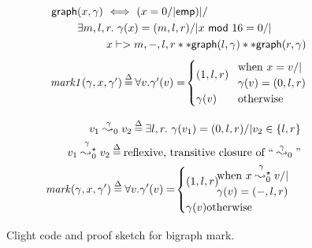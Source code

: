 \begin{figure}[t]
{\footnotesize
\begin{flushleft}
\begin{minipage}[c]{0.5\textwidth}
\begin{equation*}
\label{eqn:bigraphintrofoldunfold}
\begin{split}
\quad \mathsf{graph}&(x, \gamma) ~ <=> ~ (x = 0 /| \mathsf{emp}) |/ \\
& \exists m,l,r.~ \gamma(x)=(m,l,r) /| x~\mathsf{mod}~16 = 0 /| \\
& \qquad ~~ x |-> m,-,l,r ** \mathsf{graph}(l, \gamma) ** \mathsf{graph}(r, \gamma)
\end{split}
\end{equation*}
\begin{equation*}
\begin{array}{l@{\hspace{2pt}}c@{\hspace{2pt}}l}
\quad \m{mark1}(\gamma,x,\gamma') & \defeq & \forall v. \gamma'(v) = \! \begin{cases}
(1,l,r) \! & \begin{array}{@{}l@{}}\text{when } x = v /| \null \\ \gamma(v) = (0,l,r) \end{array} \\
\gamma(v) & \text{otherwise}
\end{cases} 
\end{array}
\end{equation*}
\end{minipage}
\vline
\begin{minipage}[c]{0.4\textwidth}
\begin{equation*}
\begin{split}
v_1 \mathrel{{\stackrel{\gamma~}{\leadsto_{0}}}} v_2 \defeq \exists l,r.~ \gamma(v_1) = (0,l,r) /| v_2 \in \{ l,r\} \\
v_1 \mathrel{{\stackrel{\gamma~}{\leadsto^{\star}_{0}}}} v_2 \defeq \text{reflexive, transitive closure of ``}\mathrel{{\stackrel{\gamma}{\leadsto}}_{0}}\text{''} 
\\
\m{mark}(\gamma,x,\gamma') \defeq
\forall v. \gamma'(v) = \! 
\begin{cases}
(1,l,r) \! 
\begin{array}{@{}l@{}}\text{when } x \mathrel{\stackrel{\gamma~}{\leadsto^{\star}_{0}}} v /| \null \\ \gamma(v) = (-,l,r) 
\end{array}\\
\gamma(v) \text{otherwise}
\end{cases}
\end{split}
\end{equation*}
\end{minipage}
\end{flushleft}
}

\vspace{-0.4em}
\caption{Clight code and proof sketch for bigraph mark.}
\label{fig:markgraph}
\vspace{-1em}
\end{figure}

